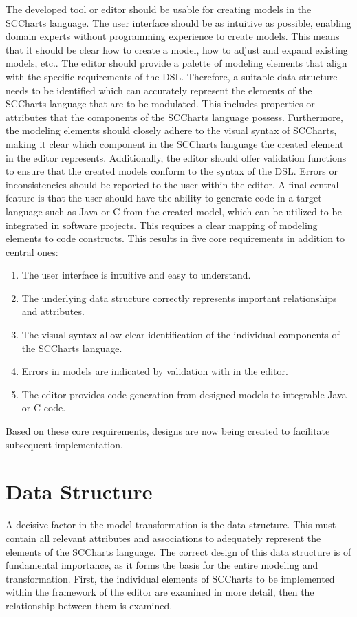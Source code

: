 The developed tool or editor should be usable for creating models in the SCCharts language. The user interface should be as intuitive as possible, enabling domain experts without programming experience to create models. This means that it should be clear how to create a model, how to adjust and expand existing models, etc.. The editor should provide a palette of modeling elements that align with the specific requirements of the DSL. Therefore, a suitable data structure needs to be identified which can accurately represent the elements of the SCCharts language that are to be modulated. This includes properties or attributes that the components of the SCCharts language possess. Furthermore, the modeling elements should closely adhere to the visual syntax of SCCharts, making it clear which component in the SCCharts language the created element in the editor represents. Additionally, the editor should offer validation functions to ensure that the created models conform to the syntax of the DSL. Errors or inconsistencies should be reported to the user within the editor. A final central feature is that the user should have the ability to generate code in a target language such as Java or C from the created model, which can be utilized to be integrated in software projects. This requires a clear mapping of modeling elements to code constructs.
This results in five core requirements in addition to central ones:
\begin{enumerate}
\item The user interface is intuitive and easy to understand.
\item The underlying data structure correctly represents important relationships and attributes.
\item The visual syntax allow clear identification of the individual components of the SCCharts language.
\item Errors in models are indicated by validation with in the editor.
\item The editor provides code generation from designed models to integrable Java or C code.
\end{enumerate}
Based on these core requirements, designs are now being created to facilitate subsequent implementation.

\section{Data Structure}\label{Data Structure}
A decisive factor in the model transformation is the data structure. This must contain all relevant attributes and associations to adequately represent the elements of the SCCharts language. The correct design of this data structure is of fundamental importance, as it forms the basis for the entire modeling and transformation. First, the individual elements of SCCharts to be implemented within the framework of the editor are examined in more detail, then the relationship between them is examined.

